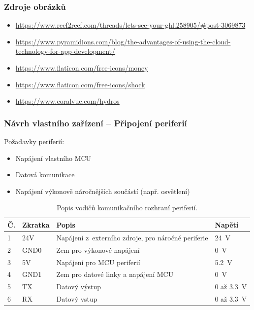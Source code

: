 \documentclass[%
  12pt,       				%
	t,                  %
	aspectratio=1610,   %
	unicode,						%
]{beamer}				    	%
\begin{document}
\begin{frame} [fragile]
	\frametitle{Zdroje obrázků}
	\begin{itemize}
		\item \url{https://www.reef2reef.com/threads/lets-see-your-ghl.258905/#post-3069873}
		\item \url{https://www.pyramidions.com/blog/the-advantages-of-using-the-cloud-technology-for-app-development/}
		\item \url{https://www.flaticon.com/free-icons/money}
		\item \url{https://www.flaticon.com/free-icons/shock}
		\item \url{https://www.coralvue.com/hydros}
	\end{itemize}			
\end{frame}

\begin{frame}[fragile]
	\frametitle{Návrh vlastního zařízení -- Připojení periferií}
	
			Požadavky periferií:\\[1ex]
			\begin{itemize}
				\item Napájení vlastního MCU
				\item Datová komunikace 
				\item Napájení výkonově náročnějších součástí (např. osvětlení)
			\end{itemize}
			\vspace{1.5ex}%
			\begin{table}[h!]
				\centering
				\caption{Popis vodičů komunikačního rozhraní periferií.}
				\label{tab:sbernice-popis-vodicu}
				\begin{tabular}{llll}
					\toprule
					\textbf{Č.} & \textbf{Zkratka} & \textbf{Popis} & \textbf{Napětí} \\
					\midrule
					1 & 24V & Napájení z~externího zdroje, pro náročné periferie & \qty{24}{V} \\
					2 & GND0 & Zem pro výkonové napájení & \qty{0}{V}\\
					3 & 5V & Napájení pro MCU periferií & \qty{5.2}{V}\\
					4 & GND1 & Zem pro datové linky a napájení MCU & \qty{0}{V}\\
					5 & TX & Datový výstup & 0 až \qty{3.3}{V}\\
					6 & RX & Datový vstup & 0 až \qty{3.3}{V}\\
					\bottomrule
				\end{tabular}
			\end{table}
\end{frame}
\end{document}
